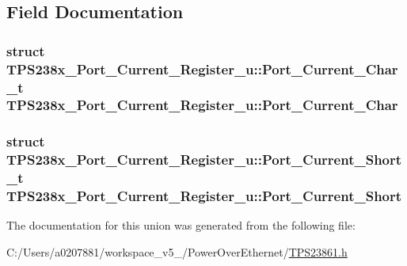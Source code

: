 \subsection{Field Documentation}
\hypertarget{union_t_p_s238x___port___current___register__u_a219a9ef00640068359f9c4f54693eee3}{
\subsubsection[{Port\-\_\-\-Current\-\_\-\-Char}]{\setlength{\rightskip}{0pt plus 5cm}struct {\bf T\-P\-S238x\-\_\-\-Port\-\_\-\-Current\-\_\-\-Register\-\_\-u\-::\-Port\-\_\-\-Current\-\_\-\-Char\-\_\-t}  T\-P\-S238x\-\_\-\-Port\-\_\-\-Current\-\_\-\-Register\-\_\-u\-::\-Port\-\_\-\-Current\-\_\-\-Char}}\label{union_t_p_s238x___port___current___register__u_a219a9ef00640068359f9c4f54693eee3}
\hypertarget{union_t_p_s238x___port___current___register__u_a8933f24a22a253977e265c3cd3e1d258}{
\subsubsection[{Port\-\_\-\-Current\-\_\-\-Short}]{\setlength{\rightskip}{0pt plus 5cm}struct {\bf T\-P\-S238x\-\_\-\-Port\-\_\-\-Current\-\_\-\-Register\-\_\-u\-::\-Port\-\_\-\-Current\-\_\-\-Short\-\_\-t}  T\-P\-S238x\-\_\-\-Port\-\_\-\-Current\-\_\-\-Register\-\_\-u\-::\-Port\-\_\-\-Current\-\_\-\-Short}}\label{union_t_p_s238x___port___current___register__u_a8933f24a22a253977e265c3cd3e1d258}


The documentation for this union was generated from the following file\-:\begin{DoxyCompactItemize}
\item 
C\-:/\-Users/a0207881/workspace\-\_\-v5\-\_/\-Power\-Over\-Ethernet/\hyperlink{_t_p_s23861_8h}{T\-P\-S23861.\-h}\end{DoxyCompactItemize}

